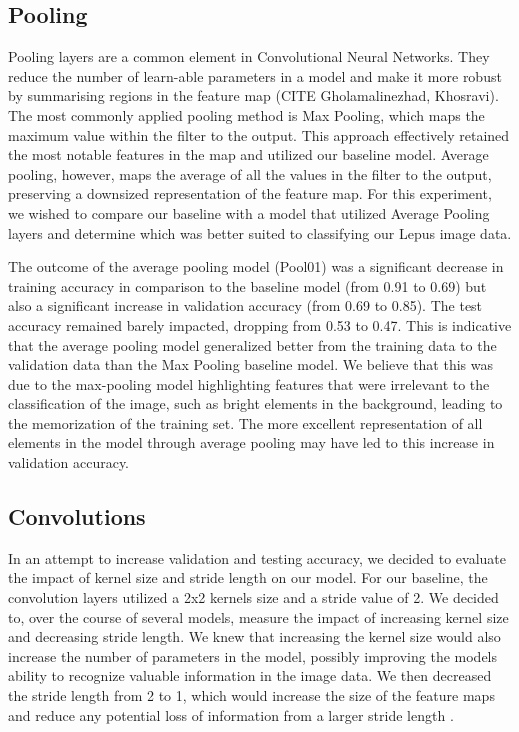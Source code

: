 \documentclass{article}
\begin{document}
\subsection{Pooling}

Pooling layers are a common element in Convolutional Neural Networks. They reduce the number of learn-able parameters in a model and make it more robust by summarising regions in the feature map (CITE Gholamalinezhad, Khosravi). The most commonly applied pooling method is Max Pooling, which maps the maximum value within the filter to the output. This approach effectively retained the most notable features in the map and utilized our baseline model. Average pooling, however, maps the average of all the values in the filter to the output, preserving a downsized representation of the feature map. For this experiment, we wished to compare our baseline with a model that utilized Average Pooling layers and determine which was better suited to classifying our Lepus image data.

The outcome of the average pooling model (Pool01) was a significant decrease in training accuracy in comparison to the baseline model (from 0.91 to 0.69) but also a significant increase in validation accuracy (from 0.69 to 0.85). The test accuracy remained barely impacted, dropping from 0.53 to 0.47. This is indicative that the average pooling model generalized better from the training data to the validation data than the Max Pooling baseline model. We believe that this was due to the max-pooling model highlighting features that were irrelevant to the classification of the image, such as bright elements in the background, leading to the memorization of the training set. The more excellent representation of all elements in the model through average pooling may have led to this increase in validation accuracy.

\subsection{Convolutions}

In an attempt to increase validation and testing accuracy, we decided to evaluate the impact of kernel size and stride length on our model. For our baseline, the convolution layers utilized a 2x2 kernels size and a stride value of 2. We decided to, over the course of several models, measure the impact of increasing kernel size and decreasing stride length. We knew that increasing the kernel size would also increase the number of parameters in the model, possibly improving the models ability to recognize valuable information in the image data. We then decreased the stride length from 2 to 1, which would increase the size of the feature maps and reduce any potential loss of information from a larger stride length \cite{Goodfellow-et-al-2016}.
\end{document}
